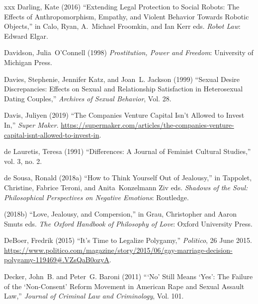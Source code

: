 \documentclass[]{jlreq} \usepackage{mystyle}
\begin{document}
\begin{thebibliography}{xxx}
Darling, Kate (2016) ``Extending Legal Protection to Social Robots: The Effects
  of Anthropomorphism, Empathy, and Violent Behavior Towards Robotic Objects,''
  in Calo, Ryan, A.~Michael Froomkin, and Ian Kerr eds.   \textit{ Robot Law}:
  Edward Elgar.

Davidson, Julia~O'Connell (1998)  \textit{ Prostitution, Power and Freedom}:
  University of Michigan Press.

Davies, Stephenie, Jennifer Katz, and Joan~L. Jackson (1999) ``Sexual Desire
  Discrepancies: Effects on Sexual and Relationship Satisfaction in
  Heterosexual Dating Couples,'' \textit{ Archives of Sexual Behavior}, Vol.
  28.

Davis, Juliyen (2019) ``The Companies Venture Capital Isn't Allowed to Invest
  In,'' \emph{Super Maker}.
  \url{https://supermaker.com/articles/the-companies-venture-capital-isnt-allowed-to-invest-in}.

{de Lauretis}, Teresa (1991) ``Differences: A Journal of Feminist Cultural
  Studies,'' vol. 3, no. 2.

{de Sousa}, Ronald (2018a) ``How to Think Yourself Out of Jealousy,'' in
  Tappolet, Christine, Fabrice Teroni, and Anita~Konzelmann Ziv eds.   \textit{
  Shadows of the Soul: Philosophical Perspectives on Negative Emotions}:
  Routledge.

 \bysame{}  (2018b) ``Love, Jealousy, and Compersion,'' in Grau, Christopher
  and Aaron Smuts eds.   \textit{ The Oxford Handbook of Philosophy of Love}:
  Oxford University Press.

DeBoer, Fredrik (2015) ``It's Time to Legalize Polygamy,'' \emph{Politico}, 26
  June 2015.
  \url{https://www.politico.com/magazine/story/2015/06/gay-marriage-decision-polygamy-119469\#.VZsQaB0ozyA}.

Decker, John~B. and Peter~G. Baroni (2011) ```No' Still Means `Yes': The
  Failure of the `Non-Consent' Reform Movement in American Rape and Sexual
  Assault Law,'' \textit{ Journal of Criminal Law and Criminology}, Vol. 101.


\end{thebibliography}
\end{document}
